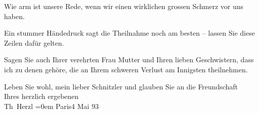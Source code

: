\pstart
           Wie arm ist unsere Rede, wenn wir einen wirklichen grossen Schmerz vor uns haben.\pend
           
\pstart
           Ein stummer Händedruck sagt die Theilnahme noch am besten – lassen Sie diese Zeilen
               dafür gelten.\pend
           
\pstart
           Sagen Sie auch Ihrer verehrten Frau Mutter und Ihren lieben Geschwistern, dass ich zu denen
               gehöre, die an Ihrem schweren Verlust \introOben{}am\introOben{} Innigsten
               theilnehmen.\pend
           
\pstart
           Leben Sie wohl, mein lieber Schnitzler und glauben Sie an die Freundschaft
               {\\[\baselineskip]}Ihres herzlich ergebenen {\\[\baselineskip]}\spacefill\mbox{Th Herzl}\pend
           \leftskip=0em{}
\pstart
           Paris4 Mai 93\pend
           \endnumbering{}  \newcommand{\dateiname}{L03827}\newcommand{\titel}{Theodor Herzl an Arthur Schnitzler, 4. 5. 1893}\newcommand{\editorInnen}{Selma Jahnke und Martin Anton Müller}

